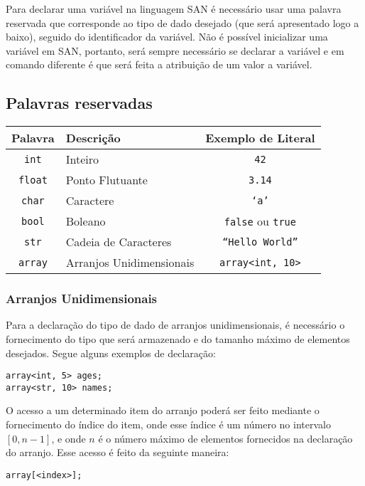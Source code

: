 \documentclass[a4paper,11pt]{article}
\begin{document}
Para declarar uma variável na linguagem SAN é necessário usar uma palavra reservada que
corresponde ao tipo de dado desejado (que será apresentado logo a baixo), seguido do
identificador da variável. Não é possível inicializar uma variável em SAN, portanto, será sempre
necessário se declarar a variável e em comando diferente é que será feita a atribuição de um valor
a variável.

\subsection{Palavras reservadas}
\begin{center}
    \begin{tabular}{|c|l|c|}
         \hline
         \textbf{Palavra} & \textbf{Descrição} & \textbf{Exemplo de Literal}\\
         \hline
         \texttt{int} & Inteiro & \texttt{42}\\
         \hline
         \texttt{float} & Ponto Flutuante & \texttt{3.14}\\
         \hline
         \texttt{char} & Caractere & \texttt{`a'}\\
         \hline
         \texttt{bool} & Boleano & \texttt{false} ou \texttt{true}\\
         \hline
         \texttt{str} & Cadeia de Caracteres & \texttt{``Hello World''}\\
         \hline
         \texttt{array} & Arranjos Unidimensionais & \texttt{array<int, 10>}\\
         \hline
    \end{tabular}
\end{center}

\subsubsection{Arranjos Unidimensionais}
Para a declaração do tipo de dado de arranjos unidimensionais, é necessário o fornecimento do
tipo que será armazenado e do tamanho máximo de elementos desejados. Segue alguns exemplos de
declaração:
\begin{lstlisting}
array<int, 5> ages;
array<str, 10> names;
\end{lstlisting}

O acesso a um determinado item do arranjo poderá ser feito mediante o fornecimento do índice
do item, onde esse índice é um número no intervalo $[0, n - 1]$, e onde $n$ é o número máximo de
elementos fornecidos na declaração do arranjo. Esse acesso é feito da seguinte maneira:
\begin{lstlisting}
array[<index>];
\end{lstlisting}
\end{document}
